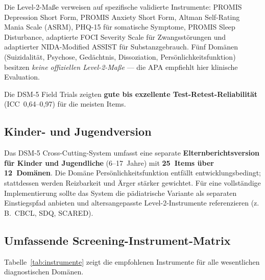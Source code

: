 \documentclass[11pt,a4paper]{article}
\begin{document}
Die Level-2-Ma\ss{}e verweisen auf spezifische validierte Instrumente: PROMIS Depression Short Form, PROMIS Anxiety Short Form, Altman Self-Rating Mania Scale (ASRM), PHQ-15 f\"ur somatische Symptome, PROMIS Sleep Disturbance, adaptierte FOCI Severity Scale f\"ur Zwangsst\"orungen und adaptierter NIDA-Modified ASSIST f\"ur Substanzgebrauch. F\"unf Dom\"anen (Suizidalit\"at, Psychose, Ged\"achtnis, Dissoziation, Pers\"onlichkeitsfunktion) besitzen \textit{keine offiziellen Level-2-Ma\ss{}e} --- die APA empfiehlt hier klinische Evaluation.

Die DSM-5 Field Trials \citep{Narrow2013} zeigten \textbf{gute bis exzellente Test-Retest-Reliabilit\"at} (ICC~0,64--0,97) f\"ur die meisten Items.

\subsection{Kinder- und Jugendversion}

Das DSM-5 Cross-Cutting-System umfasst eine separate \textbf{Elternberichtsversion f\"ur Kinder und Jugendliche} (6--17~Jahre) mit \textbf{25~Items \"uber 12~Dom\"anen}. Die Dom\"ane \glqq Pers\"onlichkeitsfunktion\grqq{} entf\"allt entwicklungsbedingt; stattdessen werden Reizbarkeit und \"Arger st\"arker gewichtet. F\"ur eine vollst\"andige Implementierung sollte das System die p\"adiatrische Variante als separaten Einstiegspfad anbieten und altersangepasste Level-2-Instrumente referenzieren (z.\,B.\ CBCL, SDQ, SCARED).

\subsection{Umfassende Screening-Instrument-Matrix}

Tabelle~\ref{tab:instrumente} zeigt die empfohlenen Instrumente f\"ur alle wesentlichen diagnostischen Dom\"anen.
\end{document}
